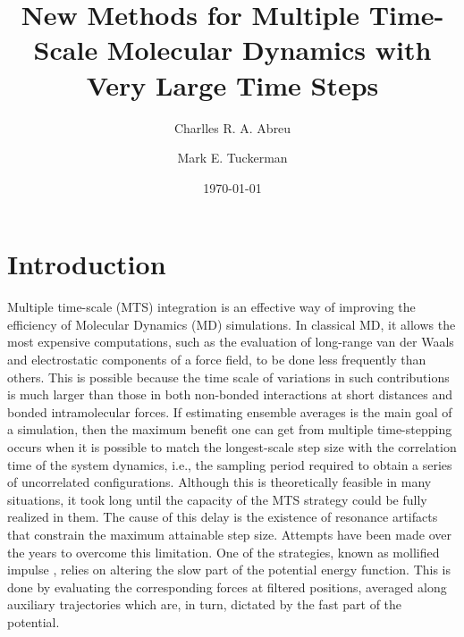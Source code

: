 \documentclass[
aip,
jcp,
reprint,
]{revtex4-1}
\begin{document}
\author{Charlles R. A. Abreu}

\author{Mark E. Tuckerman}

\title{New Methods for Multiple Time-Scale Molecular Dynamics with Very Large Time Steps}


\date{\today}

\maketitle

\section{Introduction}

Multiple time-scale (MTS) integration \cite{Grubmuller_1991, Tuckerman_1992, Martyna_1996} is an effective way of improving the efficiency of Molecular Dynamics (MD) simulations.
In classical MD, it allows the most expensive computations, such as the evaluation of long-range van der Waals and electrostatic components of a force field, to be done less frequently than others.
This is possible because the time scale of variations in such contributions is much larger than those in both non-bonded interactions at short distances and bonded intramolecular forces.
If estimating ensemble averages is the main goal of a simulation, then the maximum benefit one can get from multiple time-stepping occurs when it is possible to match the longest-scale step size with the correlation time of the system dynamics, i.e., the sampling period required to obtain a series of uncorrelated configurations.
Although this is theoretically feasible in many situations, it took long until the capacity of the MTS strategy could be fully realized in them.
The cause of this delay is the existence of resonance artifacts \cite{Biesiadecki_1993, Schlick_1998a, Ma_2003} that constrain the maximum attainable step size.
Attempts have been made over the years to overcome this limitation.
One of the strategies, known as mollified impulse \cite{Garcia-archilla_1998, Skeel_1999}, relies on altering the slow part of the potential energy function.
This is done by evaluating the corresponding forces at filtered positions, averaged along auxiliary trajectories which are, in turn, dictated by the fast part of the potential.
\end{document}
